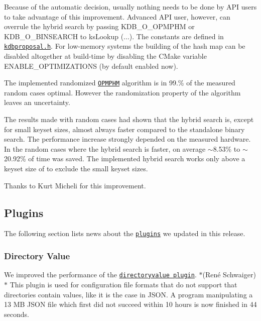 Because of the automatic decision, usually nothing needs to be done by A\+PI users to take advantage of this improvement. Advanced A\+PI user, however, can overrule the hybrid search by passing {\ttfamily K\+D\+B\+\_\+\+O\+\_\+\+O\+P\+M\+P\+HM} or {\ttfamily K\+D\+B\+\_\+\+O\+\_\+\+B\+I\+N\+S\+E\+A\+R\+CH} to {\ttfamily ks\+Lookup (...)}. The constants are defined in \href{https://master.libelektra.org/src/include/kdbproposal.h}{\tt kdbproposal.\+h}. For low-\/memory systems the building of the hash map can be disabled altogether at build-\/time by disabling the C\+Make variable {\ttfamily E\+N\+A\+B\+L\+E\+\_\+\+O\+P\+T\+I\+M\+I\+Z\+A\+T\+I\+O\+NS} (by default enabled now).

The implemented randomized \href{https://master.libelektra.org/doc/dev/data-structures.md#order-preserving-minimal-perfect-hash-map-aka-opmphm}{\tt O\+P\+M\+P\+HM} algorithm is in 99.\% of the measured random cases optimal. However the randomization property of the algorithm leaves an uncertainty.

The results made with random cases had shown that the hybrid search is, except for small keyset sizes, almost always faster compared to the standalone binary search. The performance increase strongly depended on the measured hardware. In the random cases where the hybrid search is faster, on average $\sim$8.53\% to $\sim$20.92\% of time was saved. The implemented hybrid search works only above a keyset size of {} to exclude the small keyset sizes.

Thanks to Kurt Micheli for this improvement.

\subsection*{Plugins}

The following section lists news about the \href{https://www.libelektra.org/plugins/readme}{\tt plugins} we updated in this release.

\subsubsection*{Directory Value}

We improved the performance of the \href{https://libelektra.org/plugins/directoryvalue}{\tt directoryvalue plugin}. $\ast$(René Schwaiger)$\ast$ This plugin is used for configuration file formats that do not support that directories contain values, like it is the case in J\+S\+ON. A program manipulating a 13 MB J\+S\+ON file which first did not succeed within 10 hours is now finished in 44 seconds.

